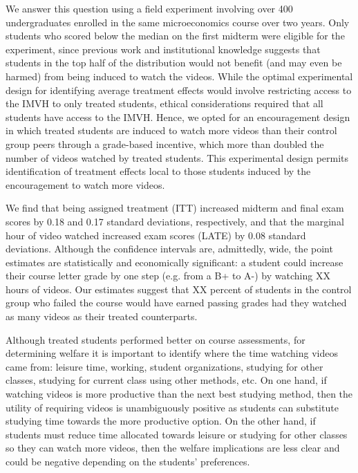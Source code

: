 \documentclass[12pt]{article}
\begin{document}
We answer this question using a field experiment involving over 400 undergraduates enrolled in the same microeconomics course over two years. Only students who scored below the median on the first midterm were eligible for the experiment, since previous work and institutional knowledge suggests that students in the top half of the distribution would not benefit (and may even be harmed) from being induced to watch the videos. While the optimal experimental design for identifying average treatment effects would involve restricting access to the IMVH to only treated students, ethical considerations required that all students have access to the IMVH. Hence, we opted for an encouragement design in which treated students are induced to watch more videos than their control group peers through a grade-based incentive, which more than doubled the number of videos watched by treated students. This experimental design permits identification of treatment effects local to those students induced by the encouragement to watch more videos.

We find that being assigned treatment (ITT) increased midterm and final exam scores by 0.18 and 0.17 standard deviations, respectively, and that the marginal hour of video watched increased exam scores (LATE) by 0.08 standard deviations. Although the confidence intervals are, admittedly, wide, the point estimates are statistically and economically significant: a student could increase their course letter grade by one step (e.g. from a B+ to A-) by watching XX hours of videos. Our estimates suggest that XX percent of students in the control group who failed the course would have earned passing grades had they watched as many videos as their treated counterparts.

Although treated students performed better on course assessments, for determining welfare it is important to identify where the time watching videos came from: leisure time, working, student organizations, studying for other classes, studying for current class using other methods, etc. On one hand, if watching videos is more productive than the next best studying method, then the utility of requiring videos is unambiguously positive as students can substitute studying time towards the more productive option. On the other hand, if students must reduce time allocated towards leisure or studying for other classes so they can watch more videos, then the welfare implications are less clear and could be negative depending on the students' preferences. 
\end{document}
